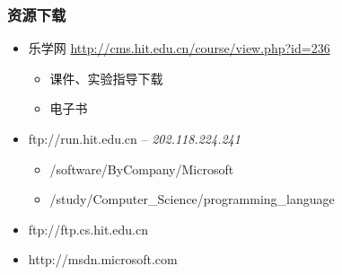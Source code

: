 \begin{frame}
\frametitle{资源下载}
\begin{itemize}
  \setlength{\itemsep}{.4cm plus 1pt}
\item 乐学网 \href{http://cms.hit.edu.cn/course/view.php?id=236}{http://cms.hit.edu.cn/course/view.php?id=236}
  \begin{itemize}
    \setlength{\itemsep}{.2cm plus 1pt}
  \item 课件、实验指导下载
  \item 电子书
  \end{itemize}
\item ftp://run.hit.edu.cn -- \textit{202.118.224.241}
  \begin{itemize}
    \setlength{\itemsep}{.2cm plus 1pt}
  \item /software/ByCompany/Microsoft
  \item /study/Computer\_Science/programming\_language
  \end{itemize}
\item ftp://ftp.cs.hit.edu.cn
\item http://msdn.microsoft.com
\end{itemize}

\end{frame}


